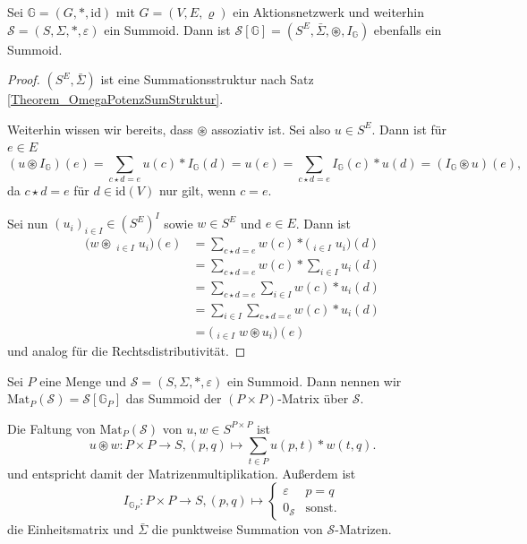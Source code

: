 \documentclass{article}
\DeclareMathOperator*{\sumbar}{\overline{\sum}}
\begin{document}
\begin{theorem}
  Sei $\mathbb{G} = (G, \ast, \text{id})$ mit $G = (V, E, \varrho)$ ein Aktionsnetzwerk
  und weiterhin $\mathcal{S} = (S, \Sigma, \ast, \varepsilon)$ ein Summoid.
  Dann ist $\mathcal{S}[\mathbb{G}] = (S^E, \bar\Sigma, \circledast, I_\mathbb{G})$ ebenfalls ein Summoid.
\end{theorem}
\begin{proof}
  $(S^E, \bar\Sigma)$ ist eine Summationsstruktur nach Satz \ref{Theorem_OmegaPotenzSumStruktur}.
  
  Weiterhin wissen wir bereits, dass $\circledast$ assoziativ ist.
  Sei also $u \in S^E$.
  Dann ist für $e \in E$
  \begin{equation*}
    (u \circledast I_\mathbb{G})(e) 
    = \sum_{c \star d = e} u(c) \ast I_\mathbb{G}(d)
    = u(e)
    = \sum_{c \star d = e} I_\mathbb{G}(c) \ast u(d)
    = (I_\mathbb{G} \circledast u)(e),
  \end{equation*}
  da $c \star d = e$ für $d \in \text{id}(V)$ nur gilt, wenn $c = e$.

  Sei nun $(u_i)_{i \in I} \in (S^E)^I$ sowie $w \in S^E$ und $e \in E$.
  Dann ist
  \begin{align*}
    \bigg( w \circledast \sumbar_{i \in I} u_i \bigg)(e)
    &= \sum_{c \star d = e} w(c) \ast \bigg( \sumbar_{i \in I} u_i \bigg)(d) \\
    &= \sum_{c \star d = e} w(c) \ast \sum_{i \in I} u_i(d) \\
    &= \sum_{c \star d = e} \sum_{i \in I} w(c) \ast u_i(d) \\
    &= \sum_{i \in I} \sum_{c \star d = e} w(c) \ast u_i(d) \\
    &= \bigg( \sumbar_{i \in I} w \circledast u_i \bigg)(e)
  \end{align*}
  und analog für die Rechtsdistributivität.
\end{proof}

\begin{definition}
  Sei $P$ eine Menge und $\mathcal{S} = (S, \Sigma, \ast, \varepsilon)$ ein Summoid.
  Dann nennen wir $\text{Mat}_P(\mathcal{S}) = \mathcal{S}[\mathbb{G}_P]$ das Summoid der $(P \times P)$-Matrix über $\mathcal{S}$.
\end{definition}

\begin{remark}
  Die Faltung von $\text{Mat}_P(\mathcal{S})$ von $u, w \in S^{P \times P}$ ist
  \begin{equation*}
    u \circledast w \colon P \times P \to S, (p, q) \mapsto \sum_{t \in P} u(p, t) \ast w(t, q).
  \end{equation*}
  und entspricht damit der Matrizenmultiplikation. Außerdem ist
  \begin{equation*}
    I_{\mathbb{G}_P} \colon P \times P \to S, (p, q) \mapsto
    \begin{cases}
      \varepsilon & p = q \\
      0_\mathcal{S} & \text{sonst.}
    \end{cases}
  \end{equation*}
  die Einheitsmatrix und $\bar\Sigma$ die punktweise Summation von $\mathcal{S}$-Matrizen.
\end{remark}
\end{document}

